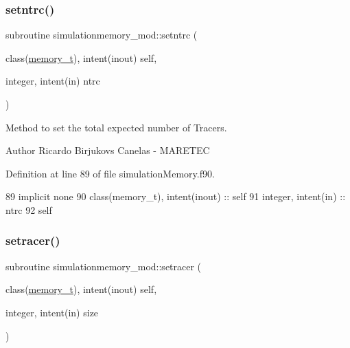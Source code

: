\subsubsection{\texorpdfstring{setntrc()}{setntrc()}}
{\footnotesize\ttfamily subroutine simulationmemory\+\_\+mod\+::setntrc (\begin{DoxyParamCaption}\item[{class(\mbox{\hyperlink{structsimulationmemory__mod_1_1memory__t}{memory\+\_\+t}}), intent(inout)}]{self,  }\item[{integer, intent(in)}]{ntrc }\end{DoxyParamCaption})\hspace{0.3cm}{\ttfamily [private]}}



Method to set the total expected number of Tracers. 

\begin{DoxyAuthor}{Author}
Ricardo Birjukovs Canelas -\/ M\+A\+R\+E\+T\+EC 
\end{DoxyAuthor}


Definition at line 89 of file simulation\+Memory.\+f90.


\begin{DoxyCode}
89     \textcolor{keywordtype}{implicit none}
90     \textcolor{keywordtype}{class}(memory\_t), \textcolor{keywordtype}{intent(inout)} :: self
91     \textcolor{keywordtype}{integer}, \textcolor{keywordtype}{intent(in)} :: ntrc
92     self%
\end{DoxyCode}
\mbox{\label{namespacesimulationmemory__mod_a3209dc0fdd14fe4a6190e67607076f65}} 
\subsubsection{\texorpdfstring{setracer()}{setracer()}}
{\footnotesize\ttfamily subroutine simulationmemory\+\_\+mod\+::setracer (\begin{DoxyParamCaption}\item[{class(\mbox{\hyperlink{structsimulationmemory__mod_1_1memory__t}{memory\+\_\+t}}), intent(inout)}]{self,  }\item[{integer, intent(in)}]{size }\end{DoxyParamCaption})\hspace{0.3cm}{\ttfamily [private]}}




